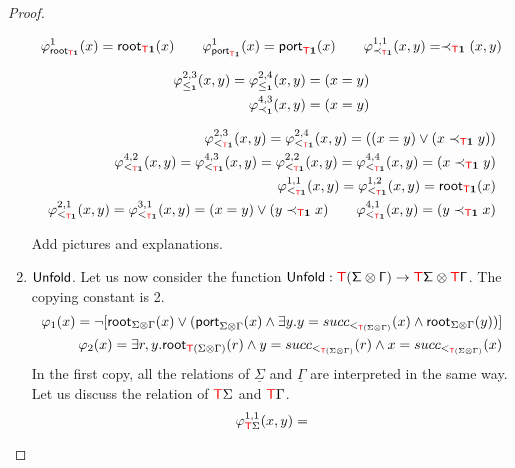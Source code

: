 \begin{proof}
\begin{enumerate}
    \begin{align*}
    \varphi^1_{\mathsf{root}_{{\color{red}{\mathsf T}}\mathbf{1}}}(x)=\mathsf{root}_{{\color{red}{\mathsf T}}\mathbf{1}}(x) \qquad \varphi^1_{\mathsf{port}_{{\color{red}{\mathsf T}}\mathbf{1}}}(x)=\mathsf{port}_{{\color{red}{\mathsf T}}\mathbf{1}}(x)
    \qquad\varphi^{1,1}_{\prec_{{\color{red}{\mathsf T}}\mathbf{1}}}(x,y)=\prec_{{\color{red}{\mathsf T}}\mathbf{1}}(x,y) 
    \end{align*}
    
    \begin{align*}
    \varphi^{2,3}_{\leq_{\mathbf{1}}}(x,y) = \varphi^{2,4}_{\leq_{\mathbf{1}}}(x,y) = (x=y)\\
    \varphi^{4,3}_{\prec_{\mathbf{1}}}(x,y) =(x=y)
    \end{align*}
    
    \begin{align*}
    \varphi^{2,3}_{<_{{\color{red}{\mathsf T}}\mathbf{1}}}(x,y)= \varphi^{2,4}_{<_{{\color{red}{\mathsf T}}\mathbf{1}}}(x,y)= ((x=y) \vee (x\prec_{{\color{red}{\mathsf T}}\mathbf{1}} y))\\
    \varphi^{4,2}_{<_{{\color{red}{\mathsf T}}\mathbf{1}}}(x,y)=\varphi^{4,3}_{<_{{\color{red}{\mathsf T}}\mathbf{1}}}(x,y)=\varphi^{2,2}_{<_{{\color{red}{\mathsf T}}\mathbf{1}}}(x,y)= \varphi^{4,4}_{<_{{\color{red}{\mathsf T}}\mathbf{1}}}(x,y)= (x\prec_{{\color{red}{\mathsf T}}\mathbf{1}} y)\\
    \varphi^{1,1}_{<_{{\color{red}{\mathsf T}}\mathbf{1}}}(x,y)=\varphi^{1,2}_{<_{{\color{red}{\mathsf T}}\mathbf{1}}}(x,y)= \mathsf{root}_{{\color{red}{\mathsf T}}\mathbf{1}}(x)\\
    \varphi^{2,1}_{<_{{\color{red}{\mathsf T}}\mathbf{1}}}(x,y)=\varphi^{3,1}_{<_{{\color{red}{\mathsf T}}\mathbf{1}}}(x,y)=(x=y) \vee (y\prec_{{\color{red}{\mathsf T}}\mathbf{1}} x)\qquad 
    \varphi^{4,1}_{<_{{\color{red}{\mathsf T}}\mathbf{1}}}(x,y)=(y\prec_{{\color{red}{\mathsf T}}\mathbf{1}} x)
    \end{align*}
    \begin{center}
    Add pictures and explanations.
    \end{center}
    \item $\sf{Unfold}$. Let us now consider the function $\sf{Unfold}:{\color{red}{\mathsf T}}(\Sigma\otimes \Gamma)\to {\color{red}{\mathsf T}}\Sigma\otimes{\color{red}{\mathsf T}}\Gamma$. The copying constant is 2. 
    \begin{align*}
    \varphi_1(x)=\neg [\mathsf{root}_{\Sigma\otimes\Gamma}(x)\vee (\mathsf{port}_{\Sigma\otimes\Gamma}(x)\wedge \exists y. y=succ_{<_{{\color{red}{\mathsf T}}(\Sigma\otimes\Gamma)}}(x) \wedge \mathsf{root}_{\Sigma\otimes\Gamma}(y))]\\
    \varphi_2(x)=\exists r, y. \mathsf{root}_{{\color{red}{\mathsf T}}(\Sigma\otimes\Gamma)}(r) \wedge y=succ_{<_{{\color{red}{\mathsf T}}(\Sigma\otimes\Gamma)}}(r) \wedge x= succ_{<_{{\color{red}{\mathsf T}}(\Sigma\otimes\Gamma)}}(x) 
    \end{align*}
    In the first copy, all the relations of $\underline{\Sigma}$ and $\underline{\Gamma}$ are interpreted in the same way. 
    Let us discuss the relation of ${\color{red}{\mathsf T}}\Sigma$ and ${\color{red}{\mathsf T}}\Gamma$.
    \[\varphi^{1,1}_{{\color{red}{\mathsf T}}\Sigma}(x,y)=\] 
    \end{enumerate} 
    
     \end{proof}